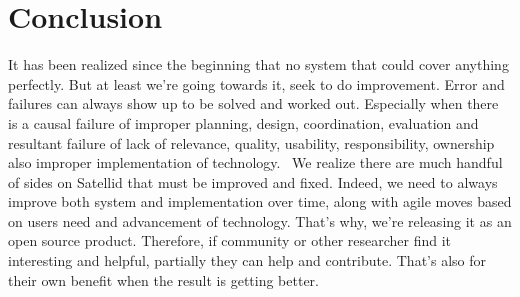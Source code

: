 \section{Conclusion}
\label{sec:conclustion}

It has been realized since the beginning that no system that could cover anything perfectly.
But at least we're going towards it, seek to do improvement.
Error and failures can always show up to be solved and worked out.
Especially when there is a causal failure of improper planning, design, coordination, evaluation and resultant failure of lack of relevance, quality, usability, responsibility, ownership also improper implementation of technology.~\autocite{Frost2014Synthesis}
We realize there are much handful of sides on Satellid that must be improved and fixed.
Indeed, we need to always improve both system and implementation over time, along with agile moves based on users need and advancement of technology.
That's why, we're releasing it as an open source product.
Therefore, if community or other researcher find it interesting and helpful, partially they can help and contribute.
That's also for their own benefit when the result is getting better.

